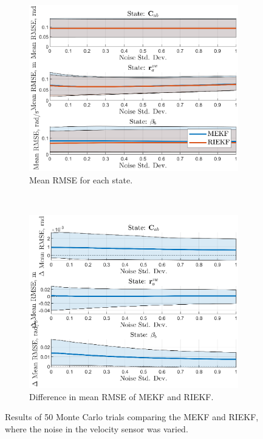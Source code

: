 \begin{figure}
	\centering
	\begin{subfigure}[b]{0.5\textwidth}
		\includegraphics[width=\textwidth]{figs/se3/bias/comp_noise_rmse_state_Bias_Vel_R.eps}
		\caption{Mean RMSE for each state.}
	\end{subfigure}
	~
	\begin{subfigure}[b]{0.5\textwidth}
		\includegraphics[width=\textwidth]{figs/se3/bias/comp_noise_diff_state_Bias_Vel_R.eps}
		\caption{Difference in mean RMSE of MEKF and RIEKF.}
	\end{subfigure}
	\caption[Results comparing the MEKF-R and RIEKF varying velocity sensor noise.]{Results of 50 Monte Carlo trials comparing the MEKF and RIEKF, where the noise in the velocity sensor was varied.}
	\label{fig:se3_comp_bias_vel}
\end{figure} 


